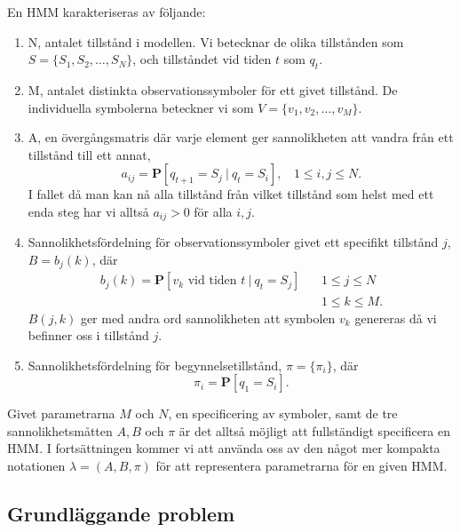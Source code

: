\documentclass[../rapport_MVEX01-11-05]{subfiles}
\begin{document}
En HMM karakteriseras av följande:
\begin{enumerate}
\item N, antalet tillstånd i modellen. Vi betecknar de olika
  tillstånden som $S = \{S_1, S_2, \dots, S_N\}$, och tillståndet vid
  tiden $t$ som $q_t$.
\item M, antalet distinkta observationssymboler för ett givet
  tillstånd. De individuella symbolerna beteckner vi som $V =
  \{v_1,v_2,\dots,v_M\}$.
\item A, en övergångsmatris där varje element ger sannolikheten att
  vandra från ett tillstånd till ett annat, 
\begin{equation*}
a_{ij} = \textbf{P}[q_{t+1} = S_j ~|~ q_t = S_i],~~~~ 1 \leq i,j \leq N.
\end{equation*}
I fallet då man kan nå alla tillstånd från vilket tillstånd som helst
med ett enda steg har vi alltså $a_{ij} > 0$ för alla $i,j$. 
\item Sannolikhetsfördelning för observationssymboler givet ett
  specifikt tillstånd $j$, $B = b_j(k)$, där 
\begin{align*}
b_j(k) = \textbf{P}[v_k \text{ vid tiden } t~|~q_t = S_j] ~~~~ &1 \leq j \leq N\\
&1 \leq k \leq M.
\end{align*}
$B(j,k)$ ger med andra ord sannolikheten att symbolen $v_k$ genereras
då vi befinner oss i tillstånd $j$.
\item Sannolikhetsfördelning för begynnelsetillstånd, $\pi =
  \{\pi_i\}$, där
\begin{equation*}
\pi_i = \textbf{P}[q_1 = S_i].
\end{equation*}
\end{enumerate}
Givet parametrarna $M$ och $N$, en specificering av symboler, samt de
tre sannolikhetsmåtten $A, B$ och $\pi$ är det alltså möjligt att
fullständigt specificera en HMM. I fortsättningen kommer vi att
använda oss av den något mer kompakta notationen $\lambda = (A,B,\pi)$
för att representera parametrarna för en given HMM.

\subsection{Grundläggande problem}
\end{document}

